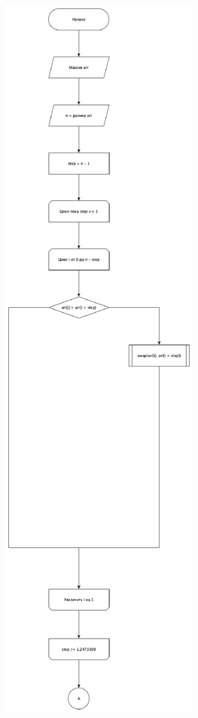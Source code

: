 \documentclass[12pt]{report}
\begin{document}
	 \begin{figure}[H]
		\centering
		\begin{minipage}[h!]{0.59\linewidth}
			\includegraphics[width=0.75\linewidth]{Hairbrush}

\end{minipage}
\end{figure}
\end{document}

